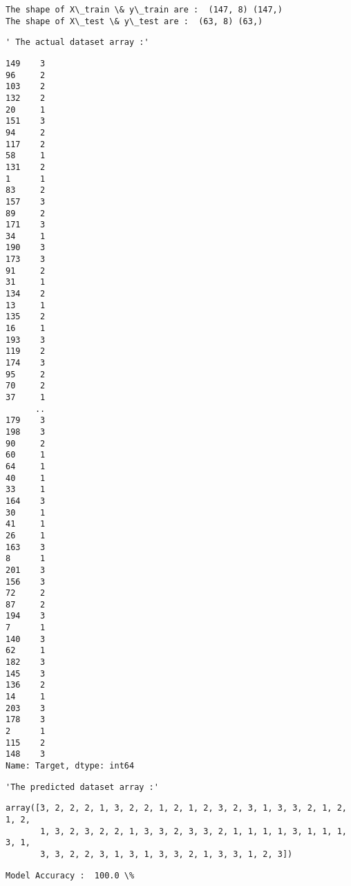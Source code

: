 \documentclass[11pt]{article}
\begin{document}
    \begin{Verbatim}[commandchars=\\\{\}]
The shape of X\_train \& y\_train are :  (147, 8) (147,)
The shape of X\_test \& y\_test are :  (63, 8) (63,)

    \end{Verbatim}

    
    \begin{verbatim}
' The actual dataset array :'
    \end{verbatim}

    
    
    \begin{verbatim}
149    3
96     2
103    2
132    2
20     1
151    3
94     2
117    2
58     1
131    2
1      1
83     2
157    3
89     2
171    3
34     1
190    3
173    3
91     2
31     1
134    2
13     1
135    2
16     1
193    3
119    2
174    3
95     2
70     2
37     1
      ..
179    3
198    3
90     2
60     1
64     1
40     1
33     1
164    3
30     1
41     1
26     1
163    3
8      1
201    3
156    3
72     2
87     2
194    3
7      1
140    3
62     1
182    3
145    3
136    2
14     1
203    3
178    3
2      1
115    2
148    3
Name: Target, dtype: int64
    \end{verbatim}

    
    
    \begin{verbatim}
'The predicted dataset array :'
    \end{verbatim}

    
    
    \begin{verbatim}
array([3, 2, 2, 2, 1, 3, 2, 2, 1, 2, 1, 2, 3, 2, 3, 1, 3, 3, 2, 1, 2, 1, 2,
       1, 3, 2, 3, 2, 2, 1, 3, 3, 2, 3, 3, 2, 1, 1, 1, 1, 3, 1, 1, 1, 3, 1,
       3, 3, 2, 2, 3, 1, 3, 1, 3, 3, 2, 1, 3, 3, 1, 2, 3])
    \end{verbatim}

    
    \begin{Verbatim}[commandchars=\\\{\}]
Model Accuracy :  100.0 \%

    \end{Verbatim}

    \begin{center}
    \end{center}
    { \hspace*{\fill} \\}
    
\end{document}
